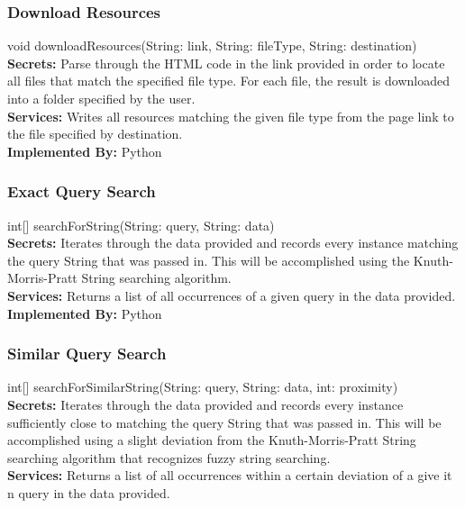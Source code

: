 \documentclass[titlepage]{article}
\begin{document}
\subsubsection{Download Resources}
void downloadResources(String: link, String: fileType, String: destination)\\

\textbf{Secrets:}
Parse through the HTML code in the link provided in order to locate all files that match the specified file type. For each file, the result is downloaded into a folder specified by the user.\\

\textbf{Services:}
Writes all resources matching the given file type from the page link to the file specified by destination.\\

\textbf{Implemented By:}
Python

\subsubsection{Exact Query Search}
int[] searchForString(String: query, String: data)\\

\textbf{Secrets:}
Iterates through the data provided and records every instance matching the query String that was passed in. This will be accomplished using the Knuth-Morris-Pratt String searching algorithm.\\

\textbf{Services:}
Returns a list of all occurrences of a given query in the data provided.\\

\textbf{Implemented By:}
Python


\subsubsection{Similar Query Search}
int[] searchForSimilarString(String: query, String: data, int: proximity)\\

\textbf{Secrets:}
Iterates through the data provided and records every instance sufficiently close to matching the query String that was passed in. This will be accomplished using a slight deviation from the Knuth-Morris-Pratt String searching algorithm that recognizes fuzzy string searching.\\

\textbf{Services:}
Returns a list of all occurrences within a certain deviation of a give it n query in the data provided.\\
\end{document}
